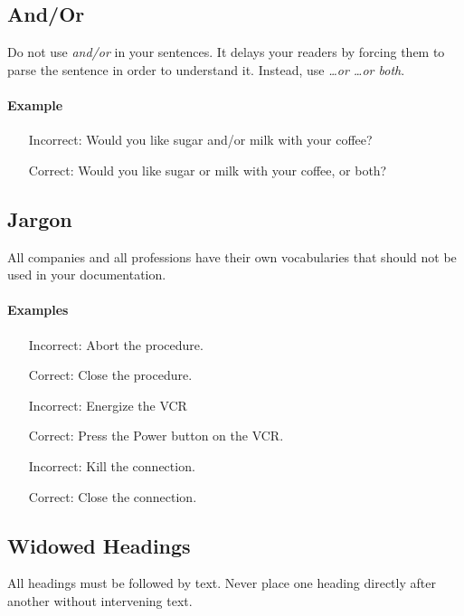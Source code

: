 \documentclass[12pt]{article}
\begin{document}
\subsection{And/Or}
Do not use \emph{and/or} in your sentences. It delays your readers by forcing them to parse the sentence in order to understand it. Instead, use \emph{\ldots or \ldots or both}. 

\paragraph{Example}

\begin{itemize} \itemsep -2pt
	\item[Incorrect:] Would you like sugar and/or milk with your coffee?
	\item[Correct:] Would you like sugar or milk with your coffee, or both?
\end{itemize}

\subsection{Jargon}
All companies and all professions have their own vocabularies that should not be used in your documentation.

\paragraph{Examples}

\begin{itemize} \itemsep -2pt
	\item[Incorrect:] Abort the procedure.
	\item[Correct:] Close the procedure. 
		\vspace{12pt}
	\item[Incorrect:] Energize the VCR
	\item[Correct:] Press the Power button on the VCR.
		\vspace{12pt}
	\item[Incorrect:] Kill the connection.
	\item[Correct:] Close the connection.
\end{itemize}

\subsection{Widowed Headings}
All headings must be followed by text. Never place one heading directly after another without intervening text.
\end{document}
